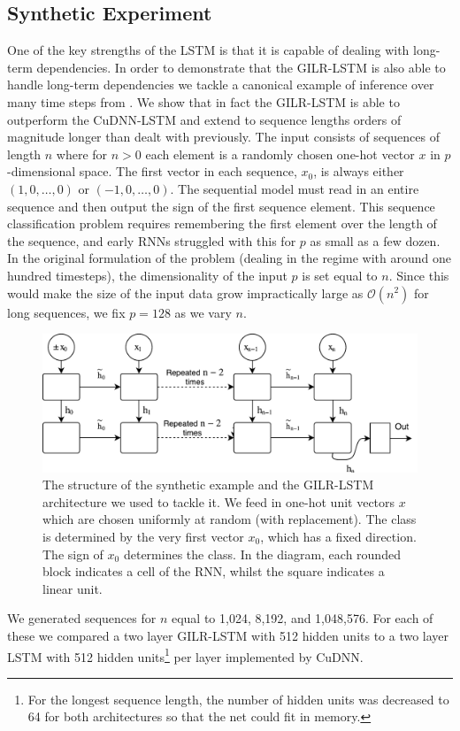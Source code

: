 \documentclass{article}
\begin{document}
\subsection{Synthetic Experiment}
One of the key strengths of the LSTM is that it is capable of dealing with
long-term dependencies. In order to demonstrate that the GILR-LSTM is also able
to handle long-term dependencies we tackle a canonical example of inference over
many time steps from \citet{hochreiter1997long}.  We show that in fact the
GILR-LSTM is able to outperform the CuDNN-LSTM and extend to sequence lengths
orders of magnitude longer than dealt with previously. The input consists of
sequences of length $n$ where for $n > 0$ each element is a randomly chosen
one-hot vector \(x\) in $p$-dimensional space.  The first vector in each
sequence, \(x_0\), is always either \((1, 0, \ldots, 0)\) or \((-1, 0, \ldots,
0)\). The sequential model must read in an entire sequence and then output the
sign of the first sequence element.  This sequence classification problem
requires remembering the first element over the length of the sequence, and
early RNNs struggled with this for \(p\) as small as a few dozen. In the
original formulation of the problem (dealing in the regime with around one
hundred timesteps), the dimensionality of the input \(p\) is set equal to
\(n\). Since this would make the size of the input data grow impractically large
as \(\mathcal{O}(n^2)\) for long sequences, we fix \(p = 128\) as we vary \(n\).
\begin{figure}[] \centering
\includegraphics[width=12cm]{synthetic_diagram.pdf}
\caption{The structure of the synthetic example and the GILR-LSTM architecture
we used to tackle it. We feed in one-hot unit vectors \(x\) which are chosen
uniformly at random (with replacement). The class is determined by the very
first vector \(x_0\), which has a fixed direction. The sign of \(x_0\)
determines the class. In the diagram, each rounded block indicates a cell of the
RNN, whilst the square indicates a linear unit.}
\label{fig:synthetic_diagram}
\end{figure} We generated sequences for $n$ equal to 1,024, 8,192, and
1,048,576. For each of these we compared a two layer GILR-LSTM with 512 hidden
units to a two layer LSTM with 512 hidden units\footnote{For the longest
sequence length, the number of hidden units was decreased to 64 for both
architectures so that the net could fit in memory.} per layer implemented by
CuDNN.
\end{document}
